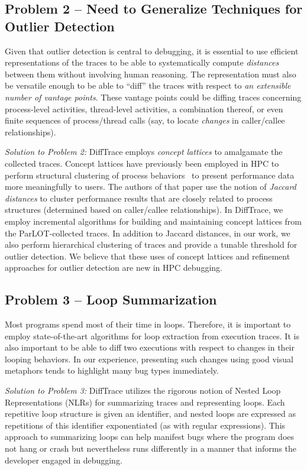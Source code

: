 \subsection{Problem 2 -- Need to Generalize Techniques for Outlier Detection\/}
Given that outlier detection is central to debugging,
it is essential to use efficient representations of the traces
to be able to systematically compute
{\em distances} between them without
involving human reasoning.
%
The representation must also be versatile enough to
be able to ``diff'' the traces
with respect to {\em an extensible number of vantage points}.
%
These vantage points could be diffing traces concerning process-level activities,
thread-level activities, a combination thereof,
or even finite sequences of process/thread calls (say, to locate {\em changes}
in caller/callee relationships).


{\em Solution to Problem 2:\/}
DiffTrace employs {\em concept lattices} to amalgamate the collected traces.
%
Concept lattices have previously been employed in HPC to perform structural
clustering of process behaviors~\cite{weberStructural} to present performance data more
meaningfully to users.
%
The authors of that paper use the notion of {\em Jaccard distances}
to cluster performance results that are closely related to process structures
(determined based on caller/callee relationships).
%
In DiffTrace, we employ incremental algorithms for building and maintaining
concept lattices from the ParLOT-collected traces.
%
In addition to Jaccard distances, in our work, we also perform hierarchical
clustering of traces and provide a tunable threshold for outlier detection.
%
We believe that these uses of concept lattices and refinement approaches
for outlier detection are new in HPC debugging.


\subsection{Problem 3 -- Loop Summarization\/}
Most programs spend most of their time in loops.
%
Therefore, it is important to employ state-of-the-art algorithms for
loop extraction from execution traces.
%
It is also important
to be able to diff two executions with respect to changes in their looping behaviors.
%
In our experience, presenting such changes using good visual metaphors
tends to highlight many bug types immediately.


{\em Solution to Problem 3:\/}
DiffTrace utilizes the rigorous notion of Nested Loop Representations (NLRs) for
summarizing traces and representing loops.
%
Each repetitive loop structure is given an identifier, and nested loops are
expressed as repetitions of this identifier exponentiated (as with regular
expressions).
%
This approach to summarizing loops can help manifest
bugs where the program does not hang or crash but nevertheless
runs differently in a manner that informs the developer engaged in debugging.

